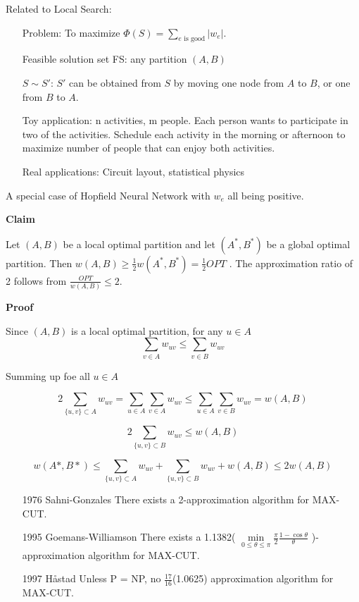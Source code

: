 \documentclass{article}
\begin{document}
Related to Local Search:
\begin{itemize}
    \item [Problem:]  To maximize $\displaystyle \Phi(S)=\sum_{e\text{ is good}}|w_e|$.
    \item [Feasible solution] set FS: any partition $(A, B)$ 
    \item [$S\sim S'$:] $S'$ can be obtained from $S$ by moving one node from $A$ to $B$, or one from $B$ to $A$.
\end{itemize}

\begin{itemize}
    \item [Toy] application:
    \subitem n activities, m people.
    \subitem Each person wants to participate in two of the activities.
    \subitem Schedule each activity in the morning or afternoon to maximize number of people that can enjoy both activities.
    \item [Real] applications:
    \subitem Circuit layout, statistical physics
\end{itemize}\par

A special case of Hopfield Neural Network with $w_e$ all being positive. 

\textbf{Claim}\par

Let $(A, B)$ be a local optimal partition and let $(A^*, B^*)$ be a global optimal partition.  Then $w(A, B) \ge \frac{1}{2} w(A^*, B^*) = \frac{1}{2}OPT$ . The approximation ratio of 2 follows from $\frac{OPT}{w(A, B)} \le 2$.\par

\textbf{Proof}\par

Since $(A,B)$ is a local optimal partition, for any $u \in A$
$$\sum\limits_{v \in A}w_{uv} \le \sum\limits_{v \in B}w_{uv}$$

Summing up foe all $u \in A$

$$2\sum\limits_{\{u,v\} \subset A}w_{uv} = \sum\limits_{u \in A}\sum\limits_{v \in A}w_{uv} \le \sum\limits_{u \in A}\sum\limits_{v \in B}w_{uv} = w(A,B)$$

$$2\sum\limits_{\{u,v\} \subset B}w_{uv} \le w(A,B)$$

$$w(A*,B*) \le \sum\limits_{\{u,v\} \subset A}w_{uv} + \sum\limits_{\{u,v\} \subset B}w_{uv} + w(A,B) \le 2w(A,B)$$

\begin{itemize}
    \item [1976] Sahni-Gonzales  There exists a 2-approximation algorithm for MAX-CUT.
    \item [1995] Goemans-Williamson  There exists a 1.1382( $\mathop{min}\limits_{0 \le \theta \le \pi} \frac{\pi}{2}\frac{1-\cos \theta}{\theta}$ )-approximation algorithm for MAX-CUT.
    \item [1997] Håstad Unless P = NP, no $\frac{17}{16}$(1.0625) approximation algorithm for MAX-CUT.
\end{itemize}
\end{document}
